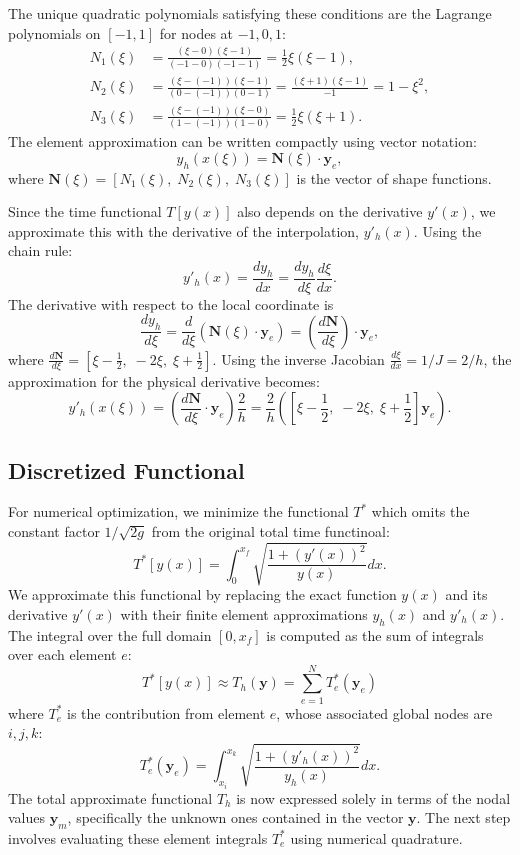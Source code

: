 \documentclass[12pt]{article}
\begin{document}
    The unique quadratic polynomials satisfying these conditions are the Lagrange polynomials on \([-1, 1]\) for nodes at \(-1, 0, 1\):
    \[
    \begin{aligned}
        N_1(\xi) &= \frac{(\xi - 0)(\xi - 1)}{(-1 - 0)(-1 - 1)} = \frac{1}{2}\xi(\xi-1), \\
        N_2(\xi) &= \frac{(\xi - (-1))(\xi - 1)}{(0 - (-1))(0 - 1)} = \frac{(\xi+1)(\xi-1)}{-1} = 1 - \xi^2 ,\\
        N_3(\xi) &= \frac{(\xi - (-1))(\xi - 0)}{(1 - (-1))(1 - 0)} = \frac{1}{2}\xi(\xi+1).
    \end{aligned}
    \]
    The element approximation can be written compactly using vector notation:
    \[
        y_h\left(x(\xi)\right) = \mathbf{N}(\xi) \cdot \mathbf{y}_e,
    \]
    where \( \mathbf{N}(\xi) = [N_1(\xi), \; N_2(\xi), \; N_3(\xi)] \) is the vector of shape functions.
    
    Since the time functional \( T[y(x)] \) also depends on the derivative \( y'(x) \), we approximate this with the derivative of the interpolation, \( y'_h (x) \). Using the chain rule:
    \[
        y'_h (x) = \frac{dy_h}{dx}  = \frac{dy_h}{d\xi} \frac{d\xi}{dx}.
    \]
    The derivative with respect to the local coordinate is
    \[
        \frac{dy_h}{d\xi} = \frac{d}{d\xi} (\mathbf{N}(\xi) \cdot \mathbf{y}_e) = \left( \frac{d\mathbf{N}}{d\xi} \right) \cdot \mathbf{y}_e,
    \]
    where \( \frac{d\mathbf{N}}{d\xi} = \left[ \xi - \frac{1}{2},\; -2\xi,\; \xi + \frac{1}{2} \right] \).
    Using the inverse Jacobian \( \frac{d\xi}{dx} = 1/J = 2/h \), the approximation for the physical derivative becomes:
    \[
        y'_h(x(\xi)) = \left( \frac{d\mathbf{N}}{d\xi} \cdot \mathbf{y}_e \right) \frac{2}{h} = \frac{2}{h} \left( \left[ \xi - \frac{1}{2},\; -2\xi,\; \xi + \frac{1}{2} \right] \mathbf{y}_e \right).
    \]
    
    \subsection{Discretized Functional}
    
    For numerical optimization, we minimize the functional \( T^* \) which omits the constant factor \( 1/\sqrt{2g} \) from the original total time functinoal:
    \[
        T^*[y(x)] = \int_0^{x_f} \sqrt{\frac{1 + (y'(x))^2}{y(x)}} dx .
    \]
    We approximate this functional by replacing the exact function \( y(x) \) and its derivative \( y'(x) \) with their finite element approximations \( y_h (x) \) and \( y'_h (x) \). The integral over the full domain \( [0, x_f] \) is computed as the sum of integrals over each element \(e\):
    \[
        T^*[y(x)] \approx T_h(\mathbf{y}) = \sum_{e=1}^{N} T_e^*(\mathbf{y}_e)
    \]
    where \( T_e^* \) is the contribution from element \(e\), whose associated global nodes are \(i, j, k\):
    \[
        T_e^*(\mathbf{y}_e) = \int_{x_{i}}^{x_{k}} \sqrt{\frac{1 + (y'_h(x))^2}{y_h(x)}} dx.
    \]
    The total approximate functional \( T_h \) is now expressed solely in terms of the nodal values \(\mathbf{y}_m\), specifically the unknown ones contained in the vector \(\mathbf{y}\). The next step involves evaluating these element integrals \(T_e^*\) using numerical quadrature.




    
\end{document}
